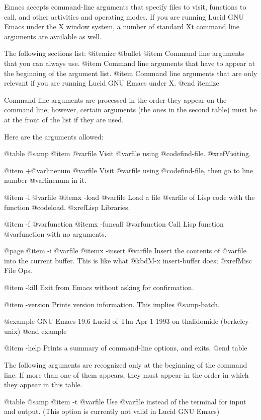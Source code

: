 {{  Emacs accepts command-line arguments that specify files to visit,
functions to call, and other activities and operating modes.  If you are
running Lucid GNU Emacs under the X window system, a number of standard
Xt command line arguments are available as well. 

The following sections list:
@itemize @bullet
@item 
Command line arguments that you can always use.
@item 
Command line arguments that have to appear at the beginning of the
argument list.
@item
Command line arguments that are only relevant if you are running Lucid
GNU Emacs under X.
@end itemize

 Command line arguments are processed in the order they appear on the
command line; however, certain arguments (the ones in the
second table) must be at the front of the list if they are used.

  Here are the arguments allowed:

@table @samp
@item @var{file}
Visit @var{file} using @code{find-file}.  @xref{Visiting}.

@item +@var{linenum} @var{file}
Visit @var{file} using @code{find-file}, then go to line number
@var{linenum} in it.

@item -l @var{file}
@itemx -load @var{file}
Load a file @var{file} of Lisp code with the function @code{load}.
@xref{Lisp Libraries}.

@item -f @var{function}
@itemx -funcall @var{function}
Call Lisp function @var{function} with no arguments.

@page
@item -i @var{file}
@itemx -insert @var{file}
Insert the contents of @var{file} into the current buffer.  This is like
what @kbd{M-x insert-buffer} does; @xref{Misc File Ops}.

@item -kill
Exit from Emacs without asking for confirmation.

@item -version
Prints version information.  This implies @samp{-batch}.

@example
GNU Emacs 19.6 Lucid of Thu Apr  1 1993 on thalidomide (berkeley-unix)
@end example

@item -help
Prints a summary of command-line options, and exits.
@end table

  The following arguments are recognized only at the beginning of the
command line.  If more than one of them appears, they must appear in the
order in which they appear in this table.

@table @samp
@item -t @var{file}
Use @var{file} instead of the terminal for input and output. (This
option is currently not valid in Lucid GNU Emacs)

}}
